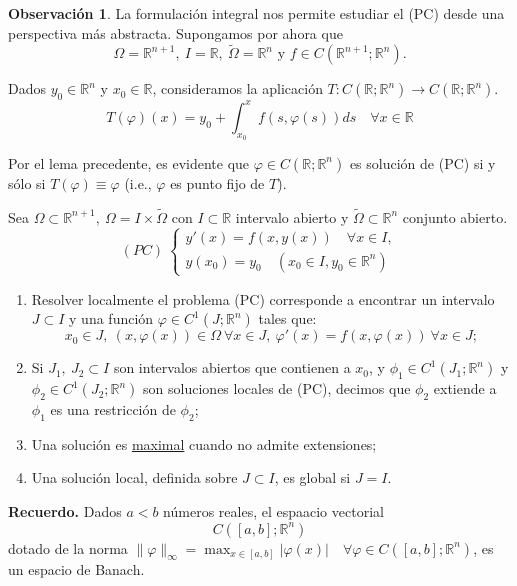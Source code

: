 \documentclass[11pt]{article}
\theoremstyle{definition} %
\newtheorem{remark}[theorem]{Observación}
\newcommand{\R}{\mathbb{R}}
\begin{document}
		\begin{remark}
			La formulación integral nos permite estudiar el (PC) desde una perspectiva más abstracta. Supongamos por ahora que
			\[ \Omega = \R^{n+1},\ I = \R,\ \widetilde{\Omega} = \R^n \text{ y } f \in C(\R^{n+1};\R^n). \]
		\end{remark}

		\noindent Dados $y_0 \in \R^n$ y $x_0 \in \R$, consideramos la aplicación $T: C(\R;\R^n) \to C(\R;\R^n)$.
		\[ T(\varphi)(x) = y_0 + \int_{x_0}^{x} f(s,\varphi(s)) ds \quad \forall x \in \R \]
		
		\noindent Por el lema precedente, es evidente que $\varphi \in C(\R;\R^n)$ es solución de (PC) si y sólo si $T(\varphi) \equiv \varphi$ (i.e., $\varphi$ es punto fijo de $T$).

Sea $\Omega \subset \R^{n+1},\ \Omega = I \times \widetilde{\Omega}$ con $I \subset \R$ intervalo abierto y $\widetilde{\Omega} \subset \R^n$ conjunto abierto.
\[ (PC) \ \begin{cases}
	y'(x) = f(x, y(x))\quad \forall x \in I, \\
	y(x_0) = y_0 \quad (x_0 \in I, y_0 \in \R^n)
\end{cases} \]

\begin{enumerate}
	\item Resolver localmente el problema (PC) corresponde a encontrar un intervalo $J \subset I$ y una función $\varphi \in C^1 (J;\R^n)$ tales que:
	\[ x_0 \in J,\ (x,\varphi(x)) \in \Omega \ \forall x \in J,\ \varphi'(x) = f(x,\varphi(x))\ \forall x \in J; \]

	\item Si $J_1,\ J_2 \subset I$ son intervalos abiertos que contienen a $x_0$, y $\phi_1 \in C^1(J_1;\R^n)$ y $\phi_2 \in C^1(J_2; \R^n)$ son soluciones locales de (PC), decimos que $\phi_2$ extiende a $\phi_{1}$ es una restricción de $\phi_{2}$;

	\item Una solución es \underline{maximal} cuando no admite extensiones;

	\item Una solución local, definida sobre $J \subset I$, es global si $J = I$.
\end{enumerate}

\noindent \textbf{Recuerdo.} Dados $a<b$ números reales, el espaacio vectorial
\[ C([a,b];\R^n) \]
\noindent dotado de la norma $\| \varphi \|_{\infty} = \max_{x \in [a,b]} |\varphi(x)| \quad \forall \varphi \in C([a,b];\R^n)$, es un espacio de Banach.
\end{document}
